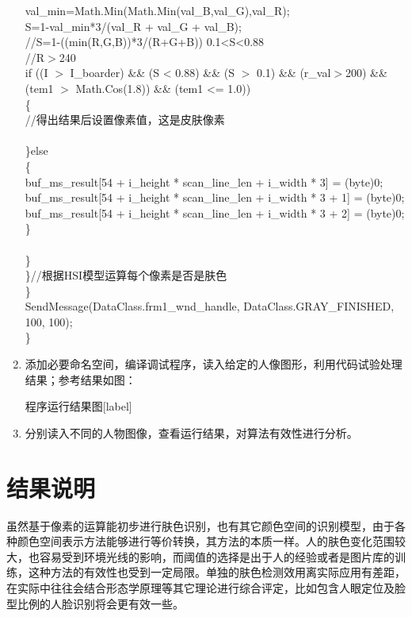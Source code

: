 ﻿\documentclass[12pt,a4paper,oneside]{book}
\begin{document}
\begin{enumerate}
\hspace*{8em}val\_min=Math.Min(Math.Min(val\_B,val\_G),val\_R);\\
\hspace*{8em}S=1-val\_min*3/(val\_R + val\_G + val\_B);\\
\hspace*{8em}//S=1-((min(R,G,B))*3/(R+G+B))  0.1<S<0.88\\
\hspace*{8em}//R$>$240\\
\hspace*{8em}if ((I $>$ I\_boarder) \&\& (S < 0.88) \&\& (S $>$ 0.1) \&\& (r\_val$>$200) \&\& (tem1 $>$ Math.Cos(1.8)) \&\& (tem1 <= 1.0))\\
\hspace*{8em}\{\\
\hspace*{10em}//得出结果后设置像素值，这是皮肤像素\\
\hspace*{8em}\\
\hspace*{8em}\}else\\
\hspace*{8em}\{\\
\hspace*{10em}buf\_ms\_result[54 + i\_height * scan\_line\_len + i\_width * 3] = (byte)0;\\
\hspace*{10em}buf\_ms\_result[54 + i\_height * scan\_line\_len + i\_width * 3 + 1] = (byte)0;\\
\hspace*{10em}buf\_ms\_result[54 + i\_height * scan\_line\_len + i\_width * 3 + 2] = (byte)0;\\
\hspace*{8em}\}\\
\hspace*{8em}\\
\hspace*{6em}\}\\
\hspace*{4em}\}//根据HSI模型运算每个像素是否是肤色  \\
\hspace*{2em}\}\\
\hspace*{2em}SendMessage(DataClass.frm1\_wnd\_handle, DataClass.GRAY\_FINISHED, 100, 100);\\
\hspace*{0em}\}\\ 
\item 添加必要命名空间，编译调试程序，读入给定的人像图形，利用代码试验处理结果；参考结果如图：
\begin{Figure}[h]{程序运行结果图}[label]
\end{Figure}
\item 分别读入不同的人物图像，查看运行结果，对算法有效性进行分析。 
\end{enumerate}
\section{结果说明} 
虽然基于像素的运算能初步进行肤色识别，也有其它颜色空间的识别模型，由于各种颜色空间表示方法能够进行等价转换，其方法的本质一样。人的肤色变化范围较大，也容易受到环境光线的影响，而阈值的选择是出于人的经验或者是图片库的训练，这种方法的有效性也受到一定局限。单独的肤色检测效用离实际应用有差距，在实际中往往会结合形态学原理等其它理论进行综合评定，比如包含人眼定位及脸型比例的人脸识别将会更有效一些。
\end{document}
